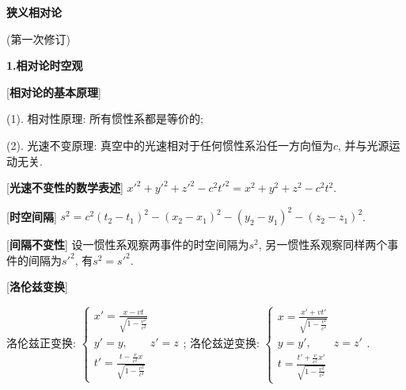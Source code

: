 


 \begin{center} 
 \Large \textbf{狭义相对论}\par
 (第一次修订)
\end{center}
 
\large 
\begin{center}
 \textbf{1.相对论时空观}
\end{center}

[\textbf{相对论的基本原理}] \par
\qquad (1). 相对性原理: 所有惯性系都是等价的;\par
\qquad (2). 光速不变原理: 真空中的光速相对于任何惯性系沿任一方向恒为$c$, 并与光源运动无关.\par

[\textbf{光速不变性的数学表述}] $x'^2+y'^2+z'^2-c^2t'^2=x^2+y^2+z^2-c^2t^2$.\par

[\textbf{时空间隔}] $s^2=c^2(t_2-t_1)^2-(x_2-x_1)^2-(y_2-y_1)^2-(z_2-z_1)^2$.\par

[\textbf{间隔不变性}] 设一惯性系观察两事件的时空间隔为$s^2$, 另一惯性系观察同样两个事件的间隔为$s'^2$, 有$s^2=s'^2$.\par

[\textbf{洛伦兹变换}]\par
\qquad 洛伦兹正变换: $\begin{cases}x'=\frac{x-vt}{\sqrt{1-\frac{v^2}{c^2}}}\\ y'=y,\qquad z'=z\\ t'=\frac{t-\frac{v}{c^2}x}{\sqrt{1-\frac{v^2}{c^2}}}\end{cases}$;
\qquad 洛伦兹逆变换: $\begin{cases}x=\frac{x'+vt'}{\sqrt{1-\frac{v^2}{c^2}}}\\ y=y',\qquad z=z'\\ t=\frac{t'+\frac{v}{c^2}x'}{\sqrt{1-\frac{v^2}{c^2}}}\end{cases}$.\par

